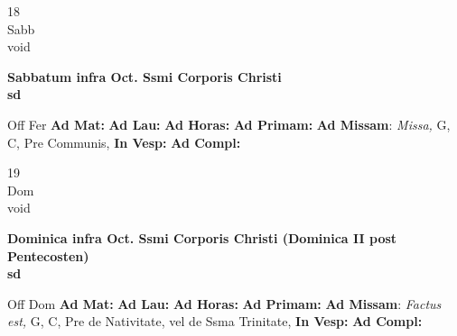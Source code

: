\documentclass[10pt, openany]{book}
\begin{document}
    \begin{center}
        \begin{minipage}{3.5in}
            \vspace{2em}
            \begin{minipage}{0.5in}
                {\Huge 18} \\
                {\normalsize Sabb} \\
                {\normalsize void}
            \end{minipage}
            \begin{minipage}{3.0in}
                \textbf{ \large Sabbatum infra Oct. Ssmi Corporis Christi \\
                \textnormal{\normalsize sd}} \\ 
            \end{minipage}
            \begin{justify}Off Fer
                \textbf{Ad Mat: }
                \textbf{Ad Lau: }
                \textbf{Ad Horas: }
                \textbf{Ad Primam: }\textbf{Ad Missam}: \textit{Missa,} G, C, Pre Communis,  
                \textbf{In Vesp: }
                \textbf{Ad Compl: }
            \end{justify}
        \end{minipage}
    \end{center}

    \begin{center}
        \begin{minipage}{3.5in}
            \vspace{2em}
            \begin{minipage}{0.5in}
                {\Huge 19} \\
                {\normalsize Dom} \\
                {\normalsize void}
            \end{minipage}
            \begin{minipage}{3.0in}
                \textbf{ \large Dominica infra Oct. Ssmi Corporis Christi (Dominica II post Pentecosten) \\
                \textnormal{\normalsize sd}} \\ 
            \end{minipage}
            \begin{justify}Off Dom
                \textbf{Ad Mat: }
                \textbf{Ad Lau: }
                \textbf{Ad Horas: }
                \textbf{Ad Primam: }\textbf{Ad Missam}: \textit{Factus est,} G, C, Pre de Nativitate, vel de Ssma Trinitate,  
                \textbf{In Vesp: }
                \textbf{Ad Compl: }
            \end{justify}
        \end{minipage}
    \end{center}
\end{document}
